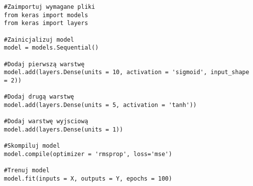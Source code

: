 \documentclass[]{article}
\theoremstyle{definition}
\begin{document}
\begin{lstlisting}
#Zaimportuj wymagane pliki
from keras import models
from keras import layers

#Zainicjalizuj model
model = models.Sequential()

#Dodaj pierwszą warstwę
model.add(layers.Dense(units = 10, activation = 'sigmoid', input_shape = 2))

#Dodaj drugą warstwę
model.add(layers.Dense(units = 5, activation = 'tanh'))

#Dodaj warstwę wyjsciową
model.add(layers.Dense(units = 1))

#Skompiluj model
model.compile(optimizer = 'rmsprop', loss='mse')

#Trenuj model
model.fit(inputs = X, outputs = Y, epochs = 100)
\end{lstlisting}

%

\end{document}
